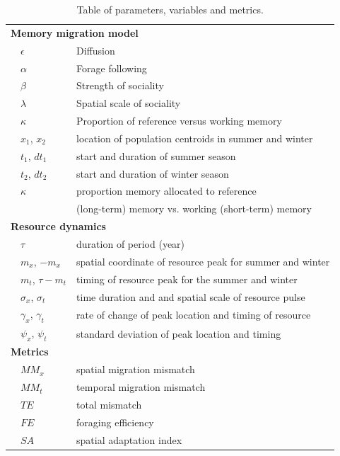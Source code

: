 \documentclass[12pt]{article}
\begin{document}
\begin{table}[b!]
	\caption{\label{tab_defs} Table of parameters, variables and metrics.}
	
	\centering
	\begin{tabular}{ll|l}
		\hline\hline
		\multicolumn{3}{l}{\textbf{Memory migration model}}\\ 
		& $\epsilon$ & Diffusion \\ 
		& $\alpha$ & Forage following \\ 
		& $\beta$ & Strength of sociality \\ 
		& $\lambda$ & Spatial scale of sociality \\ 
		& $\kappa$ & Proportion of reference versus working memory \\ 
		& $x_1$, $x_2$ & location of population centroids in summer and winter \\ 
		& $t_1$, $dt_1$ & start and duration of summer season \\ 
		& $t_2$, $dt_2$ & start and duration of winter season \\ 
		& $\kappa$ & proportion memory allocated to reference \\
		&& (long-term) memory vs. working (short-term) memory \\ 
		\multicolumn{3}{l}{\textbf{Resource dynamics}} \\ 
		& $\tau$ & duration of period (year) \\ 
		& $m_x$, $-m_x$ & spatial coordinate of resource peak for summer and winter \\ 
		& $m_t$, $\tau - m_t$ & timing of resource peak for the summer and winter \\ 
		& $\sigma_x$, $\sigma_t$ & time duration and and spatial scale of resource pulse \\ 
		& $\gamma_x$, $\gamma_t$ & rate of change of peak location and timing of resource \\ 
		& $\psi_x$, $\psi_t$ & standard deviation of peak location and timing \\ 
		\multicolumn{3}{l}{\textbf{Metrics}}\\ 
		& $MM_x$ & spatial migration mismatch \\ 
		& $MM_t$ & temporal migration mismatch \\ 
		& $TE$ & total mismatch \\ 
		& $FE$ & foraging efficiency \\ 
		& $SA$ & spatial adaptation index \\ 
		\hline\hline
	\end{tabular}
\end{table}
\end{document}
